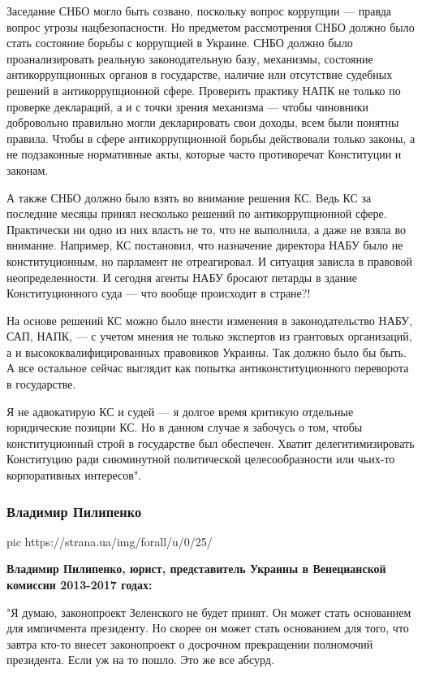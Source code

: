 Заседание СНБО могло быть созвано, поскольку вопрос коррупции --- правда вопрос
угрозы нацбезопасности. Но предметом рассмотрения СНБО должно было стать
состояние борьбы с коррупцией в Украине. СНБО должно было проанализировать
реальную законодательную базу, механизмы, состояние антикоррупционных органов в
государстве, наличие или отсутствие судебных решений в антикоррупционной сфере.
Проверить практику НАПК не только по проверке деклараций, а и с точки зрения
механизма --- чтобы чиновники добровольно правильно могли декларировать свои
доходы, всем были понятны правила. Чтобы в сфере антикоррупционной борьбы
действовали только законы, а не подзаконные нормативные акты, которые часто
противоречат Конституции и законам.

А также СНБО должно было взять во внимание решения КС. Ведь КС за последние
месяцы принял несколько решений по антикоррупционной сфере. Практически ни одно
из них власть не то, что не выполнила, а даже не взяла во внимание. Например,
КС постановил, что назначение директора НАБУ было не конституционным, но
парламент не отреагировал. И ситуация зависла в правовой неопределенности. И
сегодня агенты НАБУ бросают петарды в здание Конституционного суда --- что вообще
происходит в стране?!

На основе решений КС можно было внести изменения в законодательство НАБУ, САП,
НАПК, --- с учетом мнения не только экспертов из грантовых организаций, а и
высококвалифицированных правовиков Украины. Так должно было бы быть. А все
остальное сейчас выглядит как попытка антиконституционного переворота в
государстве.

Я не адвокатирую КС и судей --- я долгое время критикую отдельные юридические
позиции КС. Но в данном случае я забочусь о том, чтобы конституционный строй в
государстве был обеспечен. Хватит делегитимизировать Конституцию ради
сиюминутной политической целесообразности или чьих-то корпоративных интересов".

\subsubsection{Владимир Пилипенко}


\ifcmt
	pic https://strana.ua/img/forall/u/0/25/%
\fi

{\bfseries 
Владимир Пилипенко, юрист, представитель Украины в Венецианской комиссии 2013-2017 годах:
}

"Я думаю, законопроект Зеленского не будет принят. Он может стать основанием
для импичмента президенту. Но скорее он может стать основанием для того, что
завтра кто-то внесет законопроект о досрочном прекращении полномочий
президента. Если уж на то пошло. Это же все абсурд.

